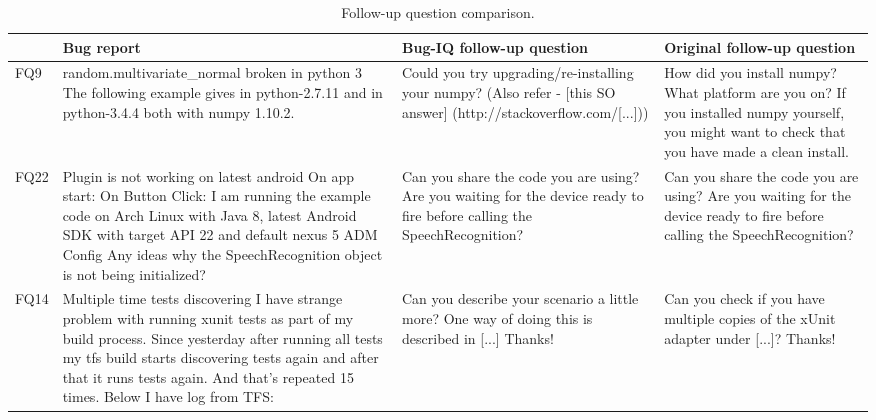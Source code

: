 \begin{table}[t]
	\centering
	\caption{Follow-up question comparison.}
	\begin{tabular}{ |p{1cm}|p{8cm}|p{4cm}|p{4cm}|  }		\hline
		&Bug report & Bug-IQ follow-up question & Original follow-up question\\		\hline
		FQ9
		& random.multivariate\_normal broken in python 3 \newline
		The following example \newline
		[...] \newline
		gives \newline
		[...] \newline
		in python-2.7.11 and \newline
		[...] \newline
		in python-3.4.4 both with numpy 1.10.2.
		& Could you try upgrading/re-installing your numpy? \newline
		(Also refer - [this SO answer] (http://stackoverflow.com/[...]))
		& How did you install numpy? What platform are you on? If you installed numpy yourself, you might want to check that you have made a clean install.		\\ \hline
		
		FQ22
		&Plugin is not working on latest android \newline
		On app start: \newline
		[...] \newline
		On Button Click: \newline
		[...] \newline
		I am running the example code on Arch Linux with Java 8, latest Android SDK with target API 22 and default nexus 5 ADM Config \newline
		Any ideas why the SpeechRecognition object is not being initialized?
		& Can you share the code you are using? Are you waiting for the device ready to fire before calling the SpeechRecognition?
		& Can you share the code you are using? Are you waiting for the device ready to fire before calling the SpeechRecognition?\\ \hline

		FQ14
		&Multiple time tests discovering \newline
		I have strange problem with running xunit tests as part of my build process. Since yesterday after running all tests my tfs build starts discovering tests again and after that it runs tests again. And that's repeated 15 times. \newline
		Below I have log from TFS: \newline
		[...]
		& Can you describe your scenario a little more? One way of doing this is described in [...] Thanks!
		& Can you check if you have multiple copies of the xUnit adapter under [...]? Thanks! \\ \hline
	\end{tabular}
\end{table}

